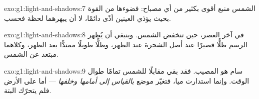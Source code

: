 \begin{solution}{exo:g1:light-and-shadows:7}
الشمس منبع أقوى بكثير من أي مصباح: فضوءها من القوة بحيث يؤذي
العينين أذًى دائمًا، لا أن يبهرهما لحظة فحسب.
\end{solution}

\begin{solution}{exo:g1:light-and-shadows:8}
في آخر العصر، حين تنخفض الشمس. وينبغي أن يُظهر الرسم ظلًّا
قصيرًا عند أصل الشجرة عند الظهر، وظلًّا طويلًا ممتدًّا بعد
الظهر، وكلاهما مبتعد عن الشمس.
\end{solution}

\begin{solution}{exo:g1:light-and-shadows:9}
سام هو المصيب. فقد بقي  مقابلًا للشمس تمامًا طوال الوقت.
وإنما استدارت ميا، فتغيّر موضع  \emph{بالقياس إلى أمامها
وخلفها} --- أما على الأرض فلم يتحرّك البتة.
\end{solution}
